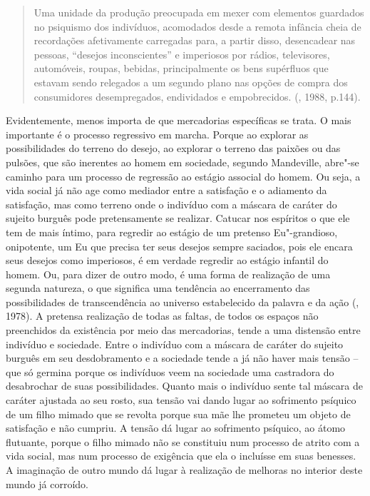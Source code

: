 \begin{quote}
Uma unidade da produção preocupada em mexer com elementos guardados no
psiquismo dos indivíduos, acomodados desde a remota infância cheia de
recordações afetivamente carregadas para, a partir disso, desencadear
nas pessoas, ``desejos inconscientes'' e imperiosos por rádios,
televisores, automóveis, roupas, bebidas, principalmente os bens
supérfluos que estavam sendo relegados a um segundo plano nas opções de
compra dos consumidores desempregados, endividados e empobrecidos.
(, 1988, p.144).
\end{quote}

Evidentemente, menos importa de que mercadorias específicas se trata. O
mais importante é o processo regressivo em marcha. Porque ao explorar as
possibilidades do terreno do desejo, ao explorar o terreno das paixões
ou das pulsões, que são inerentes ao homem em sociedade, segundo
Mandeville, abre"-se caminho para um processo de regressão ao estágio associal do
homem. Ou seja, a vida social já não age como mediador entre a
satisfação e o adiamento da satisfação, mas como terreno onde o
indivíduo com a máscara de caráter do sujeito burguês pode pretensamente
se realizar. Catucar nos espíritos o que ele tem de mais íntimo, para
regredir ao estágio de um pretenso Eu"-grandioso, onipotente, um Eu que
precisa ter seus desejos sempre saciados, pois ele encara seus desejos
como imperiosos, é em verdade regredir ao estágio infantil do homem. Ou,
para dizer de outro modo, é uma forma de realização de uma segunda
natureza, o que significa uma tendência ao encerramento das
possibilidades de transcendência ao universo estabelecido da palavra e
da ação (, 1978). A pretensa realização de todas as faltas, de
todos os espaços não preenchidos da existência por meio das mercadorias,
tende a uma distensão entre indivíduo e sociedade. Entre o indivíduo com
a máscara de caráter do sujeito burguês em seu desdobramento e a
sociedade tende a já não haver mais tensão -- que só germina porque os
indivíduos veem na sociedade uma castradora do desabrochar de suas
possibilidades. Quanto mais o indivíduo sente tal máscara de caráter
ajustada ao seu rosto, sua tensão vai dando lugar ao sofrimento psíquico
de um filho mimado que se revolta porque sua mãe lhe prometeu um objeto
de satisfação e não cumpriu. A tensão dá lugar ao sofrimento psíquico,
ao átomo flutuante, porque o filho mimado não se constituiu num processo
de atrito com a vida social, mas num processo de exigência que ela o
incluísse em suas benesses. A imaginação de outro mundo dá lugar à
realização de melhoras no interior deste mundo já corroído.

